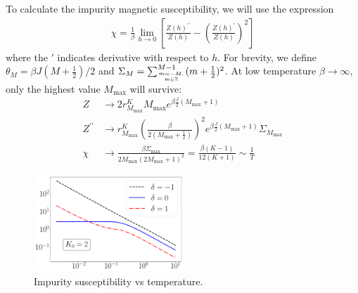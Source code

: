 \documentclass[reprint,prb,superscriptaddress]{revtex4-2}
\begin{document}
To calculate the impurity magnetic susceptibility, we will use the expression
\begin{align}
	\chi = \frac{1}{\beta}\lim_{h \to 0}\left[\frac{Z(h)^{\prime\prime}}{Z(h)} - \left(\frac{Z(h)^{\prime}}{Z(h)}\right)^2 \right] 
\end{align}
where the \(\prime\) indicates derivative with respect to \(h\). For brevity, we define \(\theta_M = \beta J (M+\frac{1}{2})/2\) and \(\Sigma_M = \sum_{m=-M, \atop{m\in \mathbb{Z}}}^{M-1}(m+\frac{1}{2})^2\).
At low temperature \(\beta \to \infty\), only the highest value \(M_\text{max}\) will survive:
\begin{align}
	Z &\to 2 r^K_{M_\text{max}} M_\text{max} e^{\beta \frac{J}{2}(M_\text{max} + 1)}\\
	Z^{\prime \prime} &\to r^K_{M_\text{max}}\left(\frac{\beta }{2(M_\text{max} + \frac{1}{2})}\right)^2 e^{\beta \frac{J}{2}(M_\text{max} + 1)}\Sigma_{M_\text{max}}\\
	\chi &\to \frac{\beta\Sigma_\text{max}}{2M_\text{max}\left(2M_\text{max}+1\right)^2} = \frac{\beta(K-1)}{12(K+1)} \sim \frac{1}{T}
\end{align}

\begin{figure}
\centering
\includegraphics[width=0.5\textwidth]{plt/Central_Field_Chi_Powerlaw_}
\caption{Impurity susceptibility vs temperature.}
\label{fig:suseptibility_impurity}
\end{figure}
\end{document}
